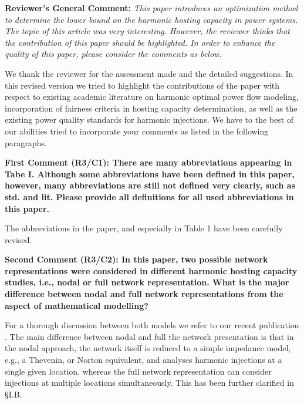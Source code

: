 \documentclass[10pt]{article}
\begin{document}
\newpage


\textbf{Reviewer's General Comment:} \newline \textit{This paper introduces an optimization method to determine the lower bound on the harmonic hosting capacity in power systems. The topic of this article was very interesting. However, the reviewer thinks that the contribution of this paper should be highlighted. In order to enhance the quality of this paper, please consider the comments as below.} 

\begin{tcolorbox}[colback=black!5!white,colframe=black]
We thank the reviewer for the assessment made and the detailed suggestions.  In this revised version we tried to highlight the contributions of the paper with respect to existing academic literature on harmonic optimal power flow modeling, incorporation of fairness criteria in hosting capacity determination, as well as the existing power quality standards for harmonic injections.  We have to the best of our abilities tried to incorporate your comments as listed in the following paragraphs.
\end{tcolorbox}

\textbf{First Comment (R3/C1): There are many abbreviations appearing in Tabe I. Although some abbreviations have been defined in this paper, however, many abbreviations are still not defined very clearly, such as std. and lit. Please provide all definitions for all used abbreviations in this paper.}

\begin{tcolorbox}[colback=black!5!white,colframe=black]
The abbreviations in the paper, and especially in Table 1 have been carefully revised.

\end{tcolorbox}

\textbf{Second Comment (R3/C2): In this paper, two possible network representations were considered in different harmonic hosting capacity studies, i.e., nodal or full network representation. What is the major difference between nodal and full network representations from the aspect of mathematical modelling?}

\begin{tcolorbox}[colback=black!5!white,colframe=black]
For a thorough discussion between both models we refer to our recent publication \cite{tom_van_acker_impact_2025}. The main difference between nodal and full the network presentation is that in the nodal approach, the network itself is reduced to a simple impedance model, e.g., a Thevenin, or Norton equivalent, and analyses harmonic injections at a single given location, whereas the full network representation can consider injections at multiple locations simultaneously. This has been further clarified in \S I.B.

\end{tcolorbox}
\end{document}
